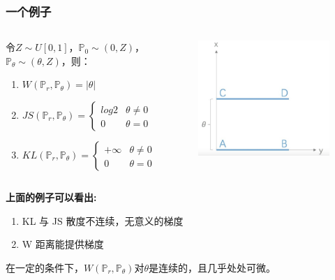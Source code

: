 \documentclass[xelatex]{beamer}
\begin{document}
\begin{frame}
\frametitle{一个例子}
\begin{columns}[t]
  \begin{example}[支撑集不重叠的分布之间的散度]
  令$\mathit{Z} \sim \mathit{U}[0,1]$，$\mathbb{P}_0 \sim (0, \mathit{Z})$，$\mathbb{P}_\theta \sim (\theta, Z)$，则：
  \begin{enumerate}
    \item $\mathit{W}(\mathbb{P}_r , \mathbb{P}_\theta) = |\theta|$
    \item 
    $
    JS(\mathbb{P}_r , \mathbb{P}_\theta) = 
    \begin{cases}
      log2 & \text{$\theta \neq 0$} \\
      0 & \text{$\theta = 0$}
    \end{cases}
    $
    \item $
    KL(\mathbb{P}_r , \mathbb{P}_\theta) = 
    \begin{cases}
      +\infty & \text{$\theta \neq 0$} \\
      0 & \text{$\theta = 0$}
    \end{cases}
    $
  \end{enumerate}
  \end{example}
  \begin{figure}
    \includegraphics[width=0.65\linewidth]{example1}
  \end{figure}
\end{columns}
\textbf{上面的例子可以看出:}
\begin{enumerate}
  \item  KL 与 JS 散度不连续，无意义的梯度
  \item W 距离能提供梯度
\end{enumerate}
\begin{theorem}
  在一定的条件下，$\mathit{W}(\mathbb{P}_r , \mathbb{P}_\theta)$对$\theta$是连续的，且几乎处处可微。
\end{theorem}
\end{frame}
\end{document}
